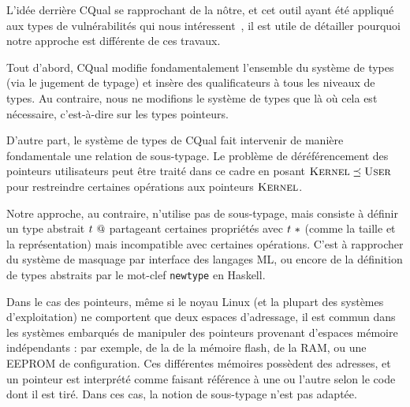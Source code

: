 L'idée derrière CQual se rapprochant de la nôtre, et cet outil ayant été
appliqué aux types de vulnérabilités qui nous intéressent~\cite{cquk-usenix04},
il est utile de détailler pourquoi notre approche est différente de ces travaux.

Tout d'abord, CQual modifie fondamentalement l'ensemble du système de types (via
le jugement de typage) et insère des qualificateurs à tous les niveaux de types.
Au contraire, nous ne modifions le système de types que là où cela est
nécessaire, c'est-à-dire sur les types pointeurs.

D'autre part, le système de types de CQual fait intervenir de manière
fondamentale une relation de sous-typage. Le problème de déréférencement des
pointeurs utilisateurs peut être traité dans ce cadre en posant $\textsc{Kernel}
\preceq \textsc{User}$ pour restreindre certaines opérations aux pointeurs $\textsc{Kernel}$.

Notre approche, au contraire, n'utilise pas de sous-typage, mais consiste à
définir un type abstrait $t~@$ partageant certaines propriétés avec
$t~*$ (comme la taille et la représentation) mais incompatible avec
certaines opérations. C'est à rapprocher du système de masquage par interface
des langages ML, ou encore de la définition de types abstraits par le mot-clef
\texttt{newtype} en Haskell.





Dans le cas des pointeurs, même si le noyau Linux (et la plupart des systèmes
d'exploitation) ne comportent que deux espaces d'adressage, il est commun dans
les systèmes embarqués de manipuler des pointeurs provenant d'espaces mémoire
indépendants : par exemple, de la de la mémoire flash, de la RAM, ou une EEPROM
de configuration. Ces différentes mémoires possèdent des adresses, et un
pointeur est interprété comme faisant référence à une ou l'autre selon le code
dont il est tiré. Dans ces cas, la notion de sous-typage n'est pas adaptée.
